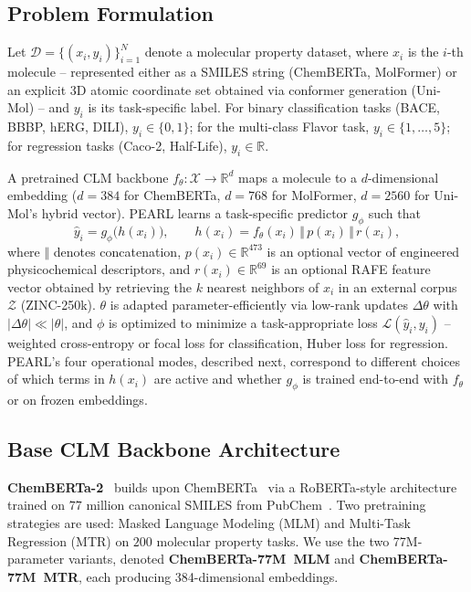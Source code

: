 \documentclass[pdflatex,sn-mathphys-num]{sn-jnl}%
\begin{document}
\subsection{Problem Formulation}\label{sec:problem_formulation}
Let $\mathcal{D} = \{(x_i, y_i)\}_{i=1}^{N}$ denote a molecular property dataset, where $x_i$ is the $i$-th molecule -- represented either as a SMILES string (ChemBERTa, MolFormer) or an explicit 3D atomic coordinate set obtained via conformer generation (Uni-Mol) -- and $y_i$ is its task-specific label. For binary classification tasks (BACE, BBBP, hERG, DILI), $y_i \in \{0,1\}$; for the multi-class Flavor task, $y_i \in \{1,\dots,5\}$; for regression tasks (Caco-2, Half-Life), $y_i \in \mathbb{R}$.

A pretrained CLM backbone $f_\theta : \mathcal{X} \rightarrow \mathbb{R}^{d}$ maps a molecule to a $d$-dimensional embedding ($d=384$ for ChemBERTa, $d=768$ for MolFormer, $d=2560$ for Uni-Mol's hybrid vector). PEARL learns a task-specific predictor $g_\phi$ such that
\begin{equation}
  \hat{y}_i = g_\phi\big(h(x_i)\big), \qquad h(x_i) = f_\theta(x_i) \,\Vert\, p(x_i) \,\Vert\, r(x_i),
\end{equation}
where $\Vert$ denotes concatenation, $p(x_i) \in \mathbb{R}^{473}$ is an optional vector of engineered physicochemical descriptors, and $r(x_i) \in \mathbb{R}^{69}$ is an optional RAFE feature vector obtained by retrieving the $k$ nearest neighbors of $x_i$ in an external corpus $\mathcal{Z}$ (ZINC-250k). $\theta$ is adapted parameter-efficiently via low-rank updates $\Delta\theta$ with $|\Delta\theta| \ll |\theta|$, and $\phi$ is optimized to minimize a task-appropriate loss $\mathcal{L}(\hat y_i, y_i)$ -- weighted cross-entropy or focal loss for classification, Huber loss for regression. PEARL's four operational modes, described next, correspond to different choices of which terms in $h(x_i)$ are active and whether $g_\phi$ is trained end-to-end with $f_\theta$ or on frozen embeddings.

\subsection{Base CLM Backbone Architecture}\label{sec:pretrained_clms}
\textbf{ChemBERTa-2}~\cite{ahmad2022chemberta2} builds upon ChemBERTa~\cite{chithrananda2020chemberta} via a RoBERTa-style architecture trained on $77$ million canonical SMILES from PubChem~\cite{kim2023pubchem}. Two pretraining strategies are used: Masked Language Modeling (MLM) and Multi-Task Regression (MTR) on $200$ molecular property tasks. We use the two 77M-parameter variants, denoted \textbf{ChemBERTa-77M~MLM} and \textbf{ChemBERTa-77M~MTR}, each producing 384-dimensional embeddings.
\end{document}
